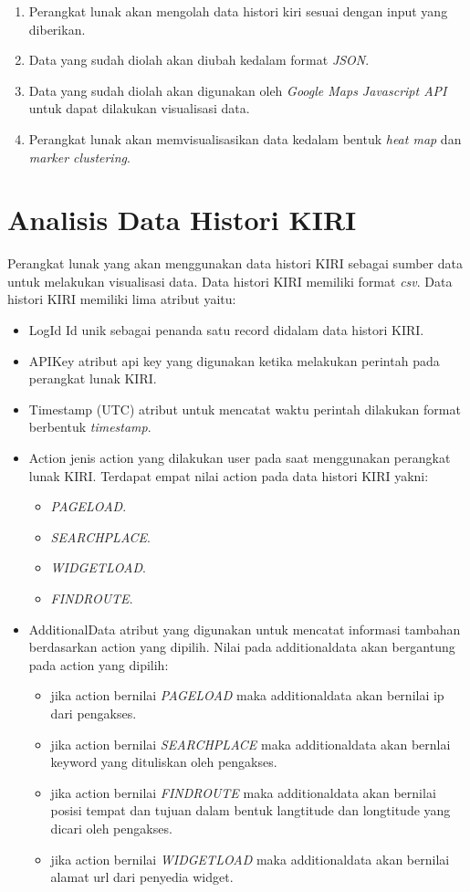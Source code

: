 \begin{enumerate}
\item Perangkat lunak akan mengolah data histori kiri sesuai dengan input yang diberikan.
\item Data yang sudah diolah  akan diubah kedalam format \textit{JSON}.
\item Data yang sudah diolah akan digunakan oleh \textit{Google Maps Javascript API} untuk dapat dilakukan visualisasi data.
\item Perangkat lunak akan memvisualisasikan data kedalam bentuk \textit{heat map} dan \textit{marker clustering}.

\end{enumerate}

\section{Analisis Data Histori KIRI}
Perangkat lunak yang akan menggunakan data histori KIRI sebagai sumber data untuk melakukan visualisasi data. Data histori KIRI memiliki format \textit{csv}. Data histori KIRI memiliki lima atribut yaitu:
\begin{itemize}
    \item LogId
    Id unik  sebagai penanda satu record didalam data histori KIRI.
    \item APIKey
     atribut api key yang digunakan ketika melakukan perintah pada perangkat lunak KIRI.
    \item Timestamp (UTC)
    atribut untuk mencatat waktu perintah dilakukan format berbentuk \textit{timestamp}.
    \item Action
    jenis action yang dilakukan user pada saat menggunakan perangkat lunak KIRI. Terdapat empat nilai action pada data histori KIRI yakni:
    \begin{itemize}
        \item \textit{PAGELOAD}.
        \item \textit{SEARCHPLACE}.
        \item \textit{WIDGETLOAD}.
        \item \textit{FINDROUTE}.
    \end{itemize}
    \item AdditionalData atribut yang digunakan untuk mencatat informasi tambahan berdasarkan action yang dipilih. Nilai pada additionaldata akan bergantung pada action yang dipilih:
    \begin{itemize}
        \item jika action bernilai \textit{PAGELOAD} maka additionaldata akan bernilai ip dari pengakses.
        \item jika action bernilai \textit{SEARCHPLACE} maka additionaldata akan bernlai keyword yang dituliskan oleh pengakses.
        \item jika action bernilai \textit{FINDROUTE} maka additionaldata akan bernilai posisi tempat dan tujuan dalam bentuk langtitude dan longtitude  yang dicari oleh pengakses.
        \item jika action bernilai \textit{WIDGETLOAD} maka additionaldata akan bernilai alamat url dari penyedia widget.
    \end{itemize}
\end{itemize}

